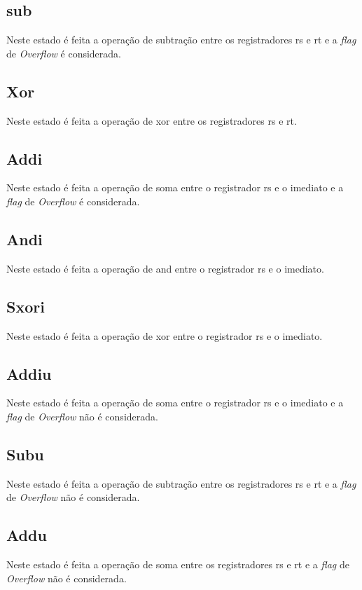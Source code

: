 \documentclass{article}
\begin{document}
    \subsection{sub}
    Neste estado é feita a operação de subtração entre os registradores rs e rt e a {\it flag} de {\it Overflow} é considerada.
    
    \subsection{Xor}
    Neste estado é feita a operação de xor entre os registradores rs e rt.
    
    \subsection{Addi}
    Neste estado é feita a operação de soma entre o registrador rs e o imediato e a {\it flag} de {\it Overflow} é considerada.
    
    \subsection{Andi}
    Neste estado é feita a operação de and entre o registrador rs e o imediato.
    
    \subsection{Sxori}
    Neste estado é feita a operação de xor entre o registrador rs e o imediato.
    
    \subsection{Addiu}
    Neste estado é feita a operação de soma entre o registrador rs e o imediato e a {\it flag} de {\it Overflow} não é considerada.
    
    \subsection{Subu}
    Neste estado é feita a operação de subtração entre os registradores rs e rt e a {\it flag} de {\it Overflow} não é considerada.
    
    \subsection{Addu}
    Neste estado é feita a operação de soma entre os registradores rs e rt e a {\it flag} de {\it Overflow} não é considerada.
    
\end{document}
